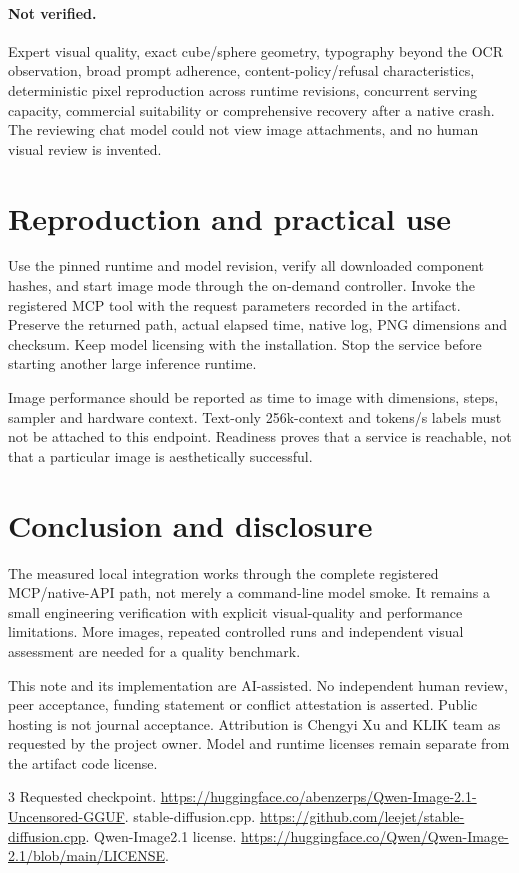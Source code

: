 \documentclass[11pt]{article}
\begin{document}
\paragraph{Not verified.} Expert visual quality, exact cube/sphere geometry, typography beyond the OCR observation, broad prompt adherence, content-policy/refusal characteristics, deterministic pixel reproduction across runtime revisions, concurrent serving capacity, commercial suitability or comprehensive recovery after a native crash. The reviewing chat model could not view image attachments, and no human visual review is invented.

\section{Reproduction and practical use}
Use the pinned runtime and model revision, verify all downloaded component hashes, and start image mode through the on-demand controller. Invoke the registered MCP tool with the request parameters recorded in the artifact. Preserve the returned path, actual elapsed time, native log, PNG dimensions and checksum. Keep model licensing with the installation. Stop the service before starting another large inference runtime.

Image performance should be reported as time to image with dimensions, steps, sampler and hardware context. Text-only 256k-context and tokens/s labels must not be attached to this endpoint. Readiness proves that a service is reachable, not that a particular image is aesthetically successful.

\section{Conclusion and disclosure}
The measured local integration works through the complete registered MCP/native-API path, not merely a command-line model smoke. It remains a small engineering verification with explicit visual-quality and performance limitations. More images, repeated controlled runs and independent visual assessment are needed for a quality benchmark.

This note and its implementation are AI-assisted. No independent human review, peer acceptance, funding statement or conflict attestation is asserted. Public hosting is not journal acceptance. Attribution is Chengyi Xu and KLIK team as requested by the project owner. Model and runtime licenses remain separate from the artifact code license.

\begin{thebibliography}{3}
 Requested checkpoint. \url{https://huggingface.co/abenzerps/Qwen-Image-2.1-Uncensored-GGUF}.
 stable-diffusion.cpp. \url{https://github.com/leejet/stable-diffusion.cpp}.
 Qwen-Image2.1 license. \url{https://huggingface.co/Qwen/Qwen-Image-2.1/blob/main/LICENSE}.
\end{thebibliography}
\end{document}
